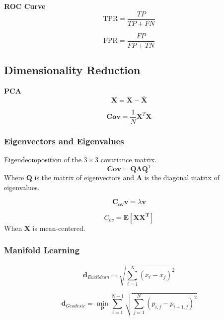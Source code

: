 \documentclass[10pt]{article}
\begin{document}
\begin{multicols}{2}
\textbf{ROC Curve}
\begin{equation}
    \text{TPR} = \frac{TP}{TP + FN}
\end{equation}

\begin{equation}
    \text{FPR} = \frac{FP}{FP + TN}
\end{equation}

\subsection*{Dimensionality Reduction}
\textbf{PCA}
\begin{equation}
    \mathbf{X} = \mathbf{X} - \bar{\mathbf{X}}
\end{equation}

\begin{equation}
    \mathbf{Cov} = \frac{1}{N} \mathbf{X}^T \mathbf{X}
\end{equation}

\subsubsection*{Eigenvectors and Eigenvalues}
Eigendeomposition of the $3 \times 3$ covariance matrix.
\begin{equation}
    \mathbf{Cov} = \mathbf{Q} \mathbf{\Lambda} \mathbf{Q}^T
\end{equation}
Where $\mathbf{Q}$ is the matrix of eigenvectors and $\mathbf{\Lambda}$ is the diagonal matrix of eigenvalues.

\begin{equation}
    \mathbf{C_{ov}} \mathbf{v} = \lambda \mathbf{v}
\end{equation}

\begin{equation}
    C_{ov} = \mathbf{E}[\mathbf{XX^T}]
\end{equation}
When $\mathbf{X}$ is mean-centered.

\subsubsection*{Manifold Learning}
\begin{equation}
    \mathbf{d}_{Euclidean} = \sqrt{\sum_{i=1}^{N} (x_i - x_j)^2}
\end{equation}

\begin{equation}
    \mathbf{d}_{Geodesic} = \min_{\mathbf{p}} \sum_{i=1}^{N-1} \sqrt{\sum_{j=1}^{N} (p_{i,j} - p_{i+1,j})^2}
    \label{eq:geodesic}
\end{equation}


\end{multicols}
\end{document}
